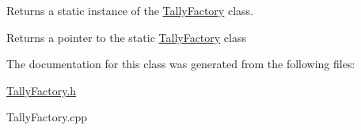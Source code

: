 Returns a static instance of the \hyperlink{classTallyFactory}{Tally\-Factory} class. 

\begin{DoxyReturn}{Returns}
a pointer to the static \hyperlink{classTallyFactory}{Tally\-Factory} class 
\end{DoxyReturn}


The documentation for this class was generated from the following files\-:\begin{DoxyCompactItemize}
\item 
\hyperlink{TallyFactory_8h}{Tally\-Factory.\-h}\item 
Tally\-Factory.\-cpp\end{DoxyCompactItemize}
